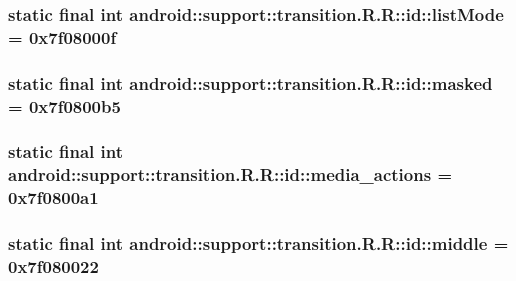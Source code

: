 \hypertarget{classandroid_1_1support_1_1transition_1_1_r_1_1id_16dde8817ffba1e14ab28422c02e74cf}{
\subsubsection[{listMode}]{\setlength{\rightskip}{0pt plus 5cm}static final int android::support::transition.R.R::id::listMode = 0x7f08000f}}
\label{classandroid_1_1support_1_1transition_1_1_r_1_1id_16dde8817ffba1e14ab28422c02e74cf}


\hypertarget{classandroid_1_1support_1_1transition_1_1_r_1_1id_3f4203b6ec66ce46aa7f9a334a3d5a5a}{
\subsubsection[{masked}]{\setlength{\rightskip}{0pt plus 5cm}static final int android::support::transition.R.R::id::masked = 0x7f0800b5}}
\label{classandroid_1_1support_1_1transition_1_1_r_1_1id_3f4203b6ec66ce46aa7f9a334a3d5a5a}


\hypertarget{classandroid_1_1support_1_1transition_1_1_r_1_1id_6bc9289d529c7058b23bc706f1ebade2}{
\subsubsection[{media\_\-actions}]{\setlength{\rightskip}{0pt plus 5cm}static final int android::support::transition.R.R::id::media\_\-actions = 0x7f0800a1}}
\label{classandroid_1_1support_1_1transition_1_1_r_1_1id_6bc9289d529c7058b23bc706f1ebade2}


\hypertarget{classandroid_1_1support_1_1transition_1_1_r_1_1id_85ff23ea0320a8fad5e8ea664552f825}{
\subsubsection[{middle}]{\setlength{\rightskip}{0pt plus 5cm}static final int android::support::transition.R.R::id::middle = 0x7f080022}}
\label{classandroid_1_1support_1_1transition_1_1_r_1_1id_85ff23ea0320a8fad5e8ea664552f825}


